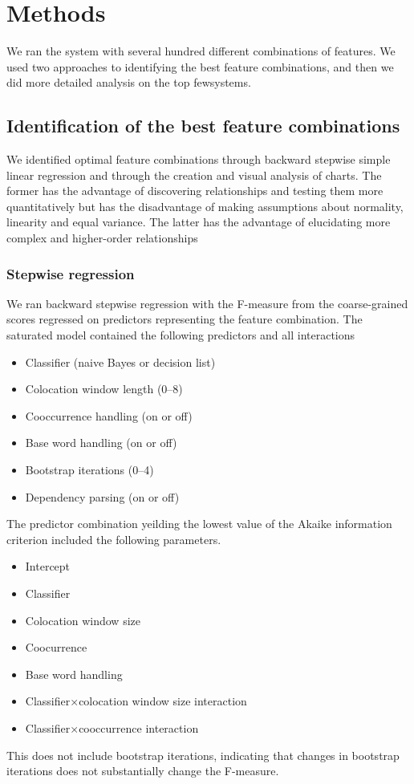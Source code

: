 \section{Methods}
\newcommand\few{few}
We ran the system with several hundred different combinations of features.
We used two approaches to identifying the best feature combinations, and then
we did more detailed analysis on the top \few systems.

\subsection{Identification of the best feature combinations}
We identified optimal feature combinations through backward stepwise simple linear regression
and through the creation and visual analysis of charts. The former has the
advantage of discovering relationships and testing them more quantitatively
but has the disadvantage of making assumptions about normality, linearity and equal variance.
The latter has the advantage of elucidating more complex and higher-order relationships

\subsubsection{Stepwise regression}
We ran backward stepwise regression with the F-measure from the coarse-grained scores
regressed on predictors representing the feature combination.
The saturated model contained the following predictors and all interactions
\begin{itemize}
\item Classifier (naive Bayes or decision list)
\item Colocation window length (0--8)
\item Cooccurrence handling (on or off)
\item Base word handling (on or off)
\item Bootstrap iterations (0--4)
\item Dependency parsing (on or off)
\end{itemize}
The predictor combination yeilding the lowest value of the Akaike information criterion
included the following parameters.
\begin{itemize}
\item Intercept
\item Classifier
\item Colocation window size
\item Coocurrence
\item Base word handling
\item Classifier$\times$colocation window size interaction
\item Classifier$\times$cooccurrence interaction
\end{itemize}
This does not include bootstrap iterations, indicating that changes
in bootstrap iterations does not substantially change the F-measure.

